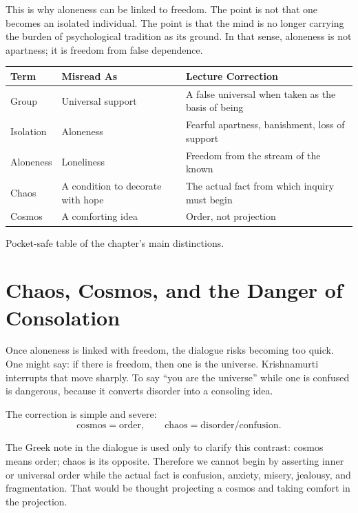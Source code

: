 This is why aloneness can be linked to freedom. The point is not that one becomes an isolated individual. The point is that the mind is no longer carrying the burden of psychological tradition as its ground. In that sense, aloneness is not apartness; it is freedom from false dependence.

\begin{table}
\centering
\begin{tabular}{p{.24\linewidth} p{.32\linewidth} p{.34\linewidth}}
\hline
Term & Misread As & Lecture Correction \\
\hline
Group & Universal support & A false universal when taken as the basis of being \\
Isolation & Aloneness & Fearful apartness, banishment, loss of support \\
Aloneness & Loneliness & Freedom from the stream of the known \\
Chaos & A condition to decorate with hope & The actual fact from which inquiry must begin \\
Cosmos & A comforting idea & Order, not projection \\
\hline
\end{tabular}

Pocket-safe table of the chapter's main distinctions.
\end{table}

\section{Chaos, Cosmos, and the Danger of Consolation}

Once aloneness is linked with freedom, the dialogue risks becoming too quick. One might say: if there is freedom, then one is the universe. Krishnamurti interrupts that move sharply. To say ``you are the universe'' while one is confused is dangerous, because it converts disorder into a consoling idea.

The correction is simple and severe:
\begin{equation}
\text{cosmos} = \text{order},
\qquad
\text{chaos} = \text{disorder/confusion}.
\end{equation}

The Greek note in the dialogue is used only to clarify this contrast: cosmos means order; chaos is its opposite. Therefore we cannot begin by asserting inner or universal order while the actual fact is confusion, anxiety, misery, jealousy, and fragmentation. That would be thought projecting a cosmos and taking comfort in the projection.

